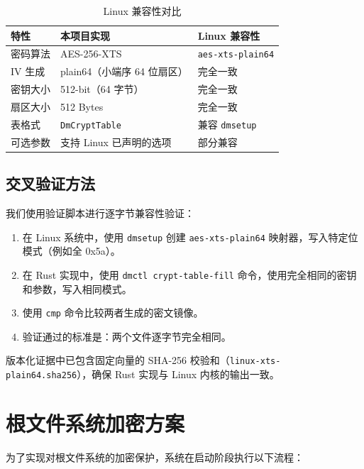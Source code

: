 \begin{table}[H]
    \centering
    \caption{Linux 兼容性对比}
    \label{tab:linux_compat}
    \begin{tabular}{p{}p{}p{}}
        \toprule
        \textbf{特性} & \textbf{本项目实现} & \textbf{Linux 兼容性} \\
        \midrule
        密码算法 & AES-256-XTS & \texttt{aes-xts-plain64} \\
        IV 生成 & plain64（小端序 64 位扇区） & 完全一致 \\
        密钥大小 & 512-bit（64 字节） & 完全一致 \\
        扇区大小 & 512 Bytes & 完全一致 \\
        表格式 & \texttt{DmCryptTable} & 兼容 \texttt{dmsetup} \\
        可选参数 & 支持 Linux 已声明的选项 & 部分兼容 \\
        \bottomrule
    \end{tabular}
\end{table}

\subsection{交叉验证方法}

我们使用验证脚本进行逐字节兼容性验证：

\begin{enumerate}
    \item 在 Linux 系统中，使用 \texttt{dmsetup} 创建 \texttt{aes-xts-plain64} 映射器，写入特定位模式（例如全 0x5a）。
    \item 在 Rust 实现中，使用 \texttt{dmctl crypt-table-fill} 命令，使用完全相同的密钥和参数，写入相同模式。
    \item 使用 \texttt{cmp} 命令比较两者生成的密文镜像。
    \item 验证通过的标准是：两个文件逐字节完全相同。
\end{enumerate}

版本化证据中已包含固定向量的 SHA-256 校验和（\texttt{linux-xts-plain64.sha256}），确保 Rust 实现与 Linux 内核的输出一致。

\section{根文件系统加密方案}

为了实现对根文件系统的加密保护，系统在启动阶段执行以下流程：

